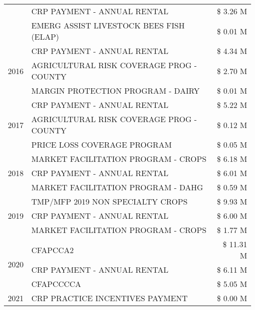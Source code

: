 \begin{tabular}{llr}
 & CRP PAYMENT - ANNUAL RENTAL & \$ 3.26 M \\
 & EMERG ASSIST LIVESTOCK BEES FISH (ELAP) & \$ 0.01 M \\
\cline{1-3}
\multirow[t]{3}{*}{2016} & CRP PAYMENT - ANNUAL RENTAL & \$ 4.34 M \\
 & AGRICULTURAL RISK COVERAGE PROG - COUNTY & \$ 2.70 M \\
 & MARGIN PROTECTION PROGRAM - DAIRY & \$ 0.01 M \\
\cline{1-3}
\multirow[t]{3}{*}{2017} & CRP PAYMENT - ANNUAL RENTAL & \$ 5.22 M \\
 & AGRICULTURAL RISK COVERAGE PROG - COUNTY & \$ 0.12 M \\
 & PRICE LOSS COVERAGE PROGRAM & \$ 0.05 M \\
\cline{1-3}
\multirow[t]{3}{*}{2018} & MARKET FACILITATION PROGRAM - CROPS & \$ 6.18 M \\
 & CRP PAYMENT - ANNUAL RENTAL & \$ 6.01 M \\
 & MARKET FACILITATION PROGRAM - DAHG & \$ 0.59 M \\
\cline{1-3}
\multirow[t]{3}{*}{2019} & TMP/MFP 2019 NON SPECIALTY CROPS & \$ 9.93 M \\
 & CRP PAYMENT - ANNUAL RENTAL & \$ 6.00 M \\
 & MARKET FACILITATION PROGRAM - CROPS & \$ 1.77 M \\
\cline{1-3}
\multirow[t]{3}{*}{2020} & CFAPCCA2 & \$ 11.31 M \\
 & CRP PAYMENT - ANNUAL RENTAL & \$ 6.11 M \\
 & CFAPCCCCA & \$ 5.05 M \\
\cline{1-3}
2021 & CRP PRACTICE INCENTIVES PAYMENT & \$ 0.00 M \\
\cline{1-3}
\bottomrule
\end{tabular}
